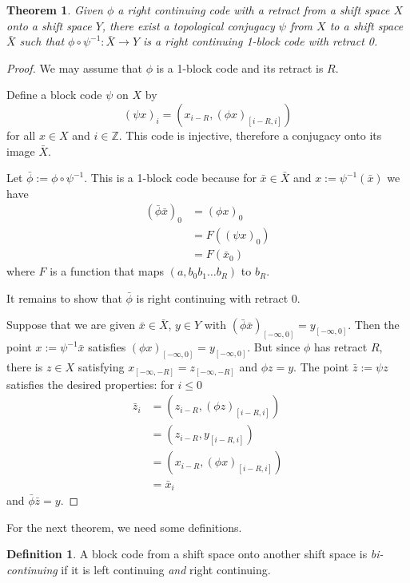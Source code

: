 \documentclass[a4paper]{amsart}
\newtheorem{theorem}{Theorem}[section]
\theoremstyle{definition}
\newtheorem{definition}{Definition}[section]
\numberwithin{equation}{section}
\numberwithin{figure}{section}
\theoremstyle{definition}
\theoremstyle{remark}
\begin{document}
\begin{theorem}
  Given $\phi$ a right continuing code with a retract from a shift space $X$ onto a shift space $Y$, there exist a topological conjugacy $\psi$ from $X$ to a shift space $\bar X$ such that $\phi \circ \psi^{-1} : \bar X \to Y$ is a right continuing 1-block code with retract 0.
\end{theorem}
\begin{proof}
  We may assume that $\phi$ is a 1-block code and its retract is $R$. 

  Define a block code $\psi$ on $X$ by
  \[ (\psi x)_i = (x_{i-R}, (\phi x)_{[i-R,i]}) \] for all $x \in X$ and $i \in {\mathbb{Z}}$. This code is injective, therefore a conjugacy onto its image $\bar X$.
  
  Let $\bar{\phi} := \phi \circ \psi^{-1}$. This is a 1-block code because for $\bar{x} \in \bar{X}$ and $x := \psi^{-1}(\bar{x})$ we have
  \begin{align*}
    (\bar\phi \bar x)_0 &= (\phi x)_0 \\
    &= F((\psi x)_0) \\
    &= F(\bar x_0)
  \end{align*}
  where $F$ is a function that maps $(a, b_0 b_1 \ldots b_R)$ to $b_R$.
  
  It remains to show that $\bar\phi$ is right continuing with retract 0.
  
  Suppose that we are given $\bar x \in \bar X$, $y \in Y$ with $(\bar\phi\bar x)_{[-\infty,0]} = y_{[-\infty,0]} $.
  Then the point $x := \psi^{-1} \bar x$ satisfies $(\phi x)_{[-\infty,0]} = y_{[-\infty,0]}$.
  But since $\phi$ has retract $R$, there is $z \in X$ satisfying $x_{[-\infty,-R]} = z_{[-\infty,-R]}$ and $\phi z = y$.
  The point $\bar z := \psi z$ satisfies the desired properties: for $i \le 0$
  \begin{align*}
    \bar z_i &= (z_{i-R}, (\phi z)_{[i-R,i ]}) \\
    &= (z_{i-R}, y_{[i-R,i]}) \\
    &= (x_{i-R}, (\phi x)_{[i-R,i]}) \\
    &= \bar x_i
  \end{align*}
  and $\bar \phi \bar z = y$.
\end{proof}

For the next theorem, we need some definitions.

\begin{definition}
  A  block code from a shift space onto another shift space is \emph{bi-continuing} if it is left continuing \emph{and} right continuing.
\end{definition}
\end{document}
